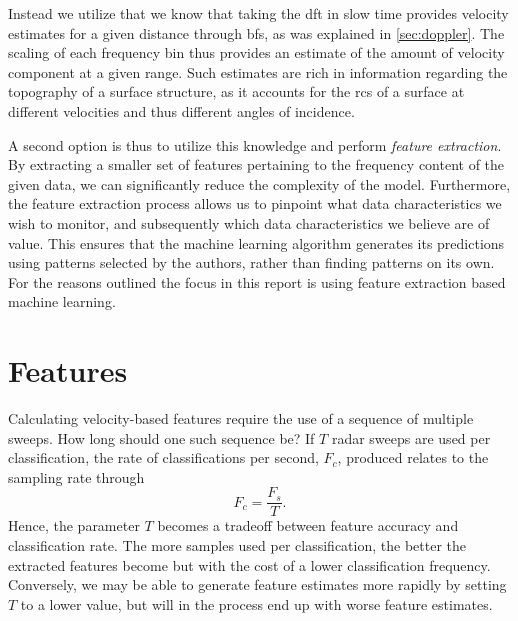 Instead we utilize that we know that taking the \gls{dft} in slow time provides velocity estimates for a given distance through \gls{bf}s, as was explained in \ref{sec:doppler}. The scaling of each frequency bin thus provides an estimate of the amount of velocity component at a given range. Such estimates are rich in information regarding the topography of a surface structure, as it accounts for the \gls{rcs} of a surface at different velocities and thus different angles of incidence. 

A second option is thus to utilize this knowledge and perform \emph{feature extraction}. By extracting a smaller set of features pertaining to the frequency content of the given data, we can significantly reduce the complexity of the model. Furthermore, the feature extraction process allows us to pinpoint what data characteristics we wish to monitor, and subsequently which data characteristics we believe are of value. This ensures that the machine learning algorithm generates its predictions using patterns selected by the authors, rather than finding patterns on its own. For the reasons outlined the focus in this report is using feature extraction based machine learning. 

\section{Features}

Calculating velocity-based features require the use of a sequence of multiple sweeps. How long should one such sequence be? If $T$ radar sweeps are used per classification, the rate of classifications per second, $F_c$, produced relates to the sampling rate through
\begin{equation}
	\label{eq:classification_rate}
	F_c = \frac{F_s}{T}.
\end{equation} 
Hence, the parameter $T$ becomes a tradeoff between feature accuracy and classification rate. The more samples used per classification, the better the extracted features become but with the cost of a lower classification frequency. Conversely, we may be able to generate feature estimates more rapidly by setting $T$ to a lower value, but will in the process end up with worse feature estimates. 


